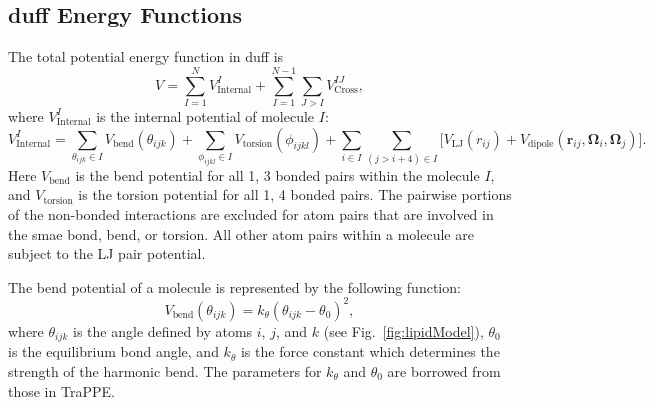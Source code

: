 \documentclass[]{book}
\begin{document}
\subsection{\label{section:energyFunctions}{\sc duff} Energy Functions}

The total potential energy function in {\sc duff} is
\begin{equation}
V = \sum^{N}_{I=1} V^{I}_{\text{Internal}}
	+ \sum^{N-1}_{I=1} \sum_{J>I} V^{IJ}_{\text{Cross}},
\label{eq:totalPotential}
\end{equation}
where $V^{I}_{\text{Internal}}$ is the internal potential of molecule $I$:
\begin{equation}
 V^{I}_{\text{Internal}} = 
	\sum_{\theta_{ijk} \in I} V_{\text{bend}}(\theta_{ijk})
	+ \sum_{\phi_{ijkl} \in I} V_{\text{torsion}}(\phi_{ijkl})
	+ \sum_{i \in I} \sum_{(j>i+4) \in I} 
	\biggl[ V_{\text{LJ}}(r_{ij}) +  V_{\text{dipole}}
	(\mathbf{r}_{ij},\boldsymbol{\Omega}_{i},\boldsymbol{\Omega}_{j})
	\biggr].
\label{eq:internalPotential}
\end{equation}
Here $V_{\text{bend}}$ is the bend potential for all 1, 3 bonded pairs
within the molecule $I$, and $V_{\text{torsion}}$ is the torsion
potential for all 1, 4 bonded pairs.  The pairwise portions of the
non-bonded interactions are excluded for atom pairs that are involved
in the smae bond, bend, or torsion. All other atom pairs within a
molecule are subject to the LJ pair potential.

The bend potential of a molecule is represented by the following function:
\begin{equation}
V_{\text{bend}}(\theta_{ijk}) = k_{\theta}( \theta_{ijk} - \theta_0
)^2, \label{eq:bendPot}
\end{equation}
where $\theta_{ijk}$ is the angle defined by atoms $i$, $j$, and $k$
(see Fig.~\ref{fig:lipidModel}), $\theta_0$ is the equilibrium
bond angle, and $k_{\theta}$ is the force constant which determines the
strength of the harmonic bend. The parameters for $k_{\theta}$ and
$\theta_0$ are borrowed from those in TraPPE.\cite{Siepmann1998}
\end{document}
